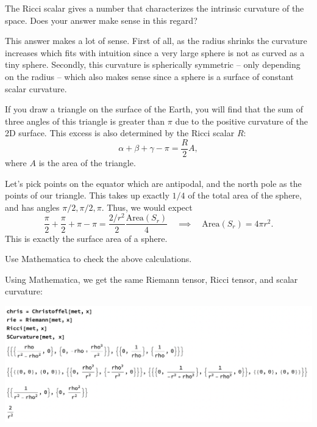 \documentclass{../../templates/lkx_pset}
\begin{document}
\begin{solution}
\[	\]
	\begin{part}{}
		The Ricci scalar gives a number that characterizes the intrinsic curvature of the space. Does your answer make sense in this regard?
	\end{part}
	This answer makes a lot of sense. First of all, as the radius shrinks the curvature increases which fits with intuition since a very large sphere is not as curved as a tiny sphere. Secondly, this curvature is spherically symmetric -- only depending on the radius -- which also makes sense since a sphere is a surface of constant scalar curvature.

	\begin{part}{}
		If you draw a triangle on the surface of the Earth, you will find that the sum of three angles of this triangle is greater than $\pi$ due to the positive curvature of the 2D surface. This excess is also determined by the Ricci scalar $R$:
		\[
			\alpha+\beta+\gamma - \pi = \frac{R}{2}A,
		\]
		where $A$ is the area of the triangle.
	\end{part}

	Let's pick points on the equator which are antipodal, and the north pole as the points of our triangle. This takes up exactly $1/4$ of the total area of the sphere, and has angles $\pi/2, \pi/2, \pi$. Thus, we would expect
	\[
		\frac{\pi}{2}+\frac{\pi}{2} + \pi - \pi = \frac{2/r^2}{2}\frac{\textrm{Area}(S_r)}{4} \quad\implies\quad \textrm{Area}(S_r) = 4\pi r^2.
	\]
	This is exactly the surface area of a sphere.
\end{solution}

\begin{problem}{2}
Use Mathematica to check the above calculations.
\end{problem}
\begin{solution}
	Using Mathematica, we get the same Riemann tensor, Ricci tensor, and scalar curvature:
	\begin{center}
		\includegraphics[scale=0.5]{problem2.png}
	\end{center}
\end{solution}
\end{document}
